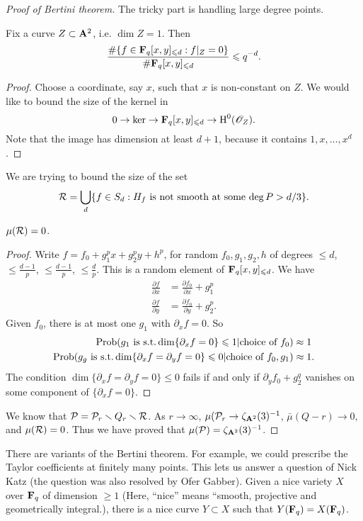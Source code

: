 \begin{proof}[Proof of Bertini theorem]
The tricky part is handling large degree points. 
\begin{lemma}
Fix a curve $Z\subset \mathbf{A}^2$, i.e. $\dim Z=1$. Then 
\[
  \frac{\#\{f\in \mathbf{F}_q[x,y]_{\leqslant d}:f|_Z=0\}}{\#\mathbf{F}_q[x,y]_{\leqslant d}} \leqslant q^{-d} .
\]
\end{lemma}
\begin{proof}
Choose a coordinate, say $x$, such that $x$ is non-constant on $Z$. We would 
like to bound the size of the kernel in 
\[
  0 \to \ker \to \mathbf{F}_q[x,y]_{\leqslant d} \to \operatorname{H}^0(\mathscr{O}_Z) .
\]
Note that the image has dimension at least $d+1$, because it contains 
$1,x,\ldots,x^d$. 
\end{proof}

We are trying to bound the size of the set 
\[
  \mathcal{R} = \bigcup_d \{f\in S_d:H_f\text{ is not smooth at some $\deg P>d/3$}\} .
\]
\begin{lemma}
$\mu(\mathcal{R})=0$. 
\end{lemma}
\begin{proof}
Write $f=f_0+g_1^p x + g_2^p y + h^p$, for random $f_0,g_1,g_2, h$ of degrees 
$\leq d$, $\leq \frac{d-1}{p}$, $\leq \frac{d-1}{p}$, $\leq \frac d p$. This is 
a random element of $\mathbf{F}_q[x,y]_{\leqslant d}$. We have 
\begin{align*}
  \frac{\partial f}{\partial x} &= \frac{\partial f_0}{\partial x} + g_1^p \\
  \frac{\partial f}{\partial y} &= \frac{\partial f_0}{\partial y} + g_2^p .
\end{align*}
Given $f_0$, there is at most one $g_1$ with $\partial_x f =0$. So 
\begin{align*}
  \operatorname{Prob}(g_1\text{ is s.t.} \dim\{\partial_x f=0\}\leqslant 1 | \text{choice of $f_0$}) 
    &\approx 1 \\
   \operatorname{Prob}(g_g\text{ is s.t.} \dim\{\partial_x f=\partial_y f=0\}\leqslant 0 | \text{choice of $f_0,g_1$})
    &\approx 1 .
\end{align*}
The condition $\dim\{\partial_x f = \partial_y f = 0\}\leq 0$ fails if and only 
if $\partial_y f_0 + g_2^q$ vanishes on some component of $\{\partial_x f=0\}$. 
\end{proof}

We know that $\mathcal{P}=\mathcal{P}_r\smallsetminus Q_r\smallsetminus \mathcal{R}$. As $r\to \infty$, 
$\mu(\mathcal{P}_r \to \zeta_{\mathbf{A}^2}(3)^{-1}$, 
$\bar\mu(Q-r) \to 0$, and $\mu(\mathcal{R})=0$. Thus we have proved that 
$\mu(\mathcal{P})=\zeta_{\mathbf{A}^2}(3)^{-1}$. 
\end{proof}

There are variants of the Bertini theorem. For example, we could prescribe the 
Taylor coefficients at finitely many points. This lets us answer a question of 
Nick Katz (the question was also resolved by Ofer Gabber). Given a nice variety 
$X$ over $\mathbf{F}_q$ of dimension $\geq 1$ (Here, ``nice'' means ``smooth, 
projective and geometrically integral.), there is a nice curve 
$Y\subset X$ such that $Y(\mathbf{F}_q)=X(\mathbf{F}_q)$.  

